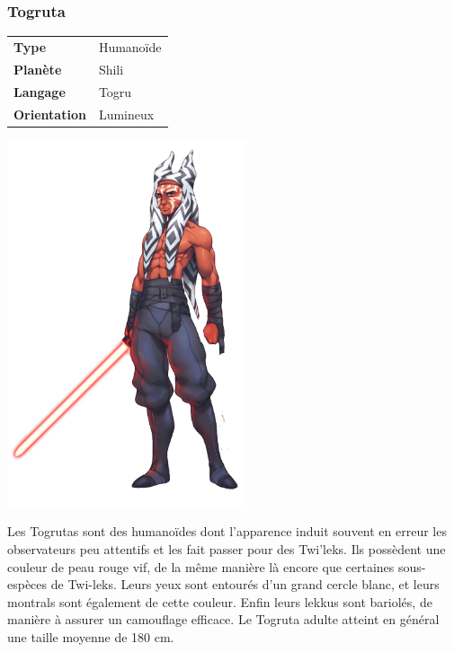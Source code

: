 \subsubsection{Togruta}
\begin{samepage}
	\begin{tabular}{ l l }
		\textbf{Type} 			& Humanoïde \\
	   	\textbf{Planète} 		& Shili \\
	   	\textbf{Langage} 		& Togru \\
	   	\textbf{Orientation} 	& Lumineux \\
	\end{tabular}

	\vspace{-9\baselineskip}
	\begin{flushright}
		\includegraphics[width=7cm]{img/personnages/races/togruta.png}
	\end{flushright}

	\vspace{-2\baselineskip}
\end{samepage}

Les Togrutas sont des humanoïdes dont l’apparence induit souvent en erreur les observateurs peu attentifs et les fait passer pour des Twi’leks. Ils possèdent une couleur de peau rouge vif, de la même manière là encore que certaines sous-espèces de Twi-leks. Leurs yeux sont entourés d’un grand cercle blanc, et leurs montrals sont également de cette couleur. Enfin leurs lekkus sont bariolés, de manière à assurer un camouflage efficace. Le Togruta adulte atteint en général une taille moyenne de 180 cm. 


